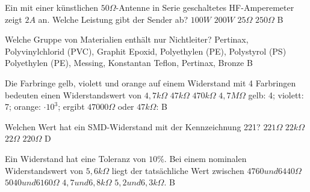 {Ein mit einer künstlichen $50\Omega$-Antenne in Serie geschaltetes HF-Amperemeter zeigt $2A$ an. Welche Leistung gibt der Sender ab?}%
{$100W$}%
{$200W$}%
{$25\Omega$}%
{$250\Omega$}%
{B}%

{Welche Gruppe von Materialien enthält nur Nichtleiter?}%
{Pertinax, Polyvinylchlorid (PVC), Graphit}%
{Epoxid, Polyethylen (PE), Polystyrol (PS)}%
{Polyethylen (PE), Messing, Konstantan}%
{Teflon, Pertinax, Bronze}%
{B}%


{Die Farbringe gelb, violett und orange auf einem Widerstand mit 4 Farbringen bedeuten einen Widerstandswert von}%
{$4,7k\Omega$}%
{$47k\Omega$}%
{$470k\Omega$}%
{$4,7M\Omega$}%
{gelb: 4; violett: 7; orange: $\cdot 10^3$; ergibt $47000\Omega$ oder $47k\Omega$: B}%

{Welchen Wert hat ein SMD-Widerstand mit der Kennzeichnung 221?}%
{$221\Omega$}%
{$22k\Omega$}%
{$22\Omega$}%
{$220\Omega$}%
{D}%

{Ein Widerstand hat eine Toleranz von $10 \%$. Bei einem nominalen Widerstandswert von $5,6 k\Omega$ liegt der tatsächliche Wert zwischen}%
{$4760 und 6440 \Omega$}%
{$5040 und 6160 \Omega$}%
{$4,7 und 6,8 k\Omega$}%
{$5,2 und 6,3 k\Omega.$}%
{B}%

